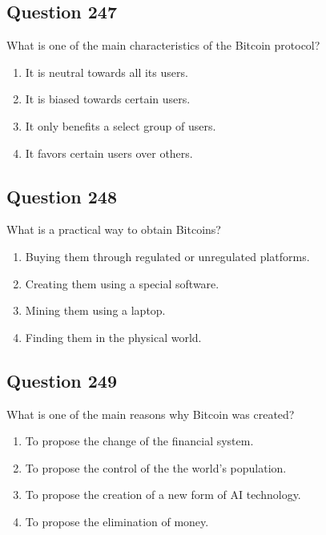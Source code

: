 \documentclass[12pt,a4paper]{article}
\begin{document}
\bigskip


\subsection*{Question 247}
What is one of the main characteristics of the Bitcoin protocol?

\begin{enumerate}[label=\Alph*., leftmargin=*]
\item It is neutral towards all its users.
\item It is biased towards certain users.
\item It only benefits a select group of users.
\item It favors certain users over others.
\end{enumerate}

\bigskip


\subsection*{Question 248}
What is a practical way to obtain Bitcoins?

\begin{enumerate}[label=\Alph*., leftmargin=*]
\item Buying them through regulated or unregulated platforms.
\item Creating them using a special software.
\item Mining them using a laptop.
\item Finding them in the physical world.
\end{enumerate}

\bigskip


\subsection*{Question 249}
What is one of the main reasons why Bitcoin was created?

\begin{enumerate}[label=\Alph*., leftmargin=*]
\item To propose the change of the financial system.
\item To propose the control of the the world's population.
\item To propose the creation of a new form of AI technology.
\item To propose the elimination of money.
\end{enumerate}
\end{document}
